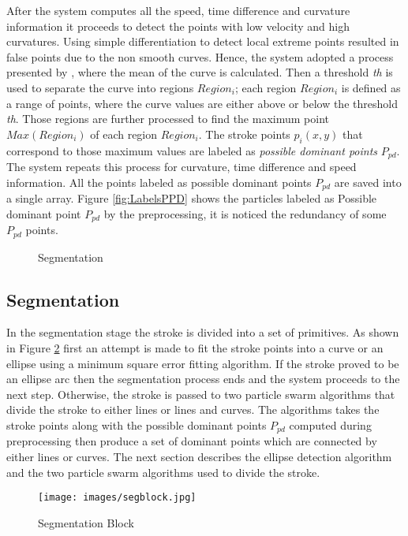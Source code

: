\documentclass{article}
\begin{document}
After the system computes all the speed, time difference and curvature information it proceeds to detect the points with low velocity and high curvatures. Using simple differentiation to detect local extreme points resulted in false points due to the non smooth curves. Hence, the system adopted a process presented by \cite{earlyprocess}, where the mean of the curve is calculated. Then a threshold \textit{th} is used to separate the curve into regions $Region_i$; each region $Region_i$ is defined as a range of points, where the curve values are either above or below the threshold \textit{th}. Those regions are further processed to find the maximum point $Max(Region_i)$ of each region $Region_i$. The stroke points $p_i(x,y)$ that correspond to those maximum values are labeled as \textit{possible dominant points} $P_{pd}$. The system repeats this process for curvature, time difference and speed information. All the points labeled as possible dominant points $P_{pd}$ are saved into a single array. Figure \ref{fig:LabelsPPD} shows the particles labeled as Possible dominant point $P_{pd}$ by the preprocessing, it is noticed the redundancy of some $P_{pd}$ points. %
\begin{figure}
	\centering
		\hfill
	\caption{Segmentation}%
	\label{fig:pso1}
\end{figure}
\subsection{Segmentation}
\label{seg}
In the segmentation stage the stroke is divided into a set of primitives. As shown in Figure \ref{fig:segblock} first an attempt is made to fit the stroke points into a curve or an ellipse using a minimum square error fitting algorithm. If the stroke proved to be an ellipse arc then the segmentation process ends and the system proceeds to the next step. Otherwise, the stroke is passed to two particle swarm algorithms that divide the stroke to either lines or lines and curves. The algorithms takes the stroke points along with the possible dominant points $P_{pd}$ computed during preprocessing then produce a set of dominant points which are connected by either lines or curves.  The next section describes the ellipse detection algorithm and the two particle swarm algorithms used to divide the stroke.
 \begin{figure}
	\centering
		\texttt{[image: images/segblock.jpg]}
	\caption{Segmentation Block}
	\label{fig:segblock}
\end{figure}
\end{document}
